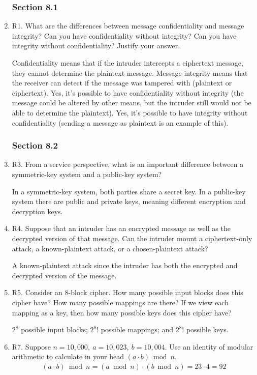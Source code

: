 \documentclass[12pt]{article}
\begin{document}
\begin{enumerate}
\subsubsection*{Section 8.1}
\item R1. What are the differences between message confidentiality and message integrity? Can you have confidentiality without integrity? Can you have integrity without confidentiality? Justify your answer.\par
\color{CrispBlue}Confidentiality means that if the intruder intercepts a ciphertext message, they cannot determine the plaintext message. Message integrity means that the receiver can detect if the message was tampered with (plaintext or ciphertext). Yes, it's possible to have confidentiality without integrity (the message could be altered by other means, but the intruder still would not be able to determine the plaintext). Yes, it's possible to have integrity without confidentiality (sending a message as plaintext is an example of this).\color{black}
\vspace{-1em}\subsubsection*{Section 8.2}
\item R3. From a service perspective, what is an important difference between a symmetric-key system and a public-key system?\par
\color{CrispBlue}In a symmetric-key system, both parties share a secret key. In a public-key system there are public and private keys, meaning different encryption and decryption keys.\color{black}
\item R4. Suppose that an intruder has an encrypted message as well as the decrypted version of that message. Can the intruder mount a ciphertext-only attack, a known-plaintext attack, or a chosen-plaintext attack?\par
\color{CrispBlue}A known-plaintext attack since the intruder has both the encrypted and decrypted version of the message.\color{black}
\item R5. Consider an 8-block cipher. How many possible input blocks does this cipher have? How many possible mappings are there? If we view each mapping as a key, then how many possible keys does this cipher have?\par
\color{CrispBlue}\(2^8 \) possible input blocks; \(2^8!\) possible mappings; and \(2^8!\) possible keys.\color{black}
\item R7. Suppose \(n=10,000,\ a=10,023,\ b=10,004\). Use an identity of modular arithmetic to calculate in your head \( (a \cdot b)\bmod{n}\).
\color{CrispBlue}
\begin{align*}
	(a \cdot b)\bmod{n}
	=(a\bmod{n}) \cdot (b\bmod{n})
	=23 \cdot 4
	=92
\end{align*}
\color{black}
\end{enumerate}
\vspace{-3em}
\end{document}
